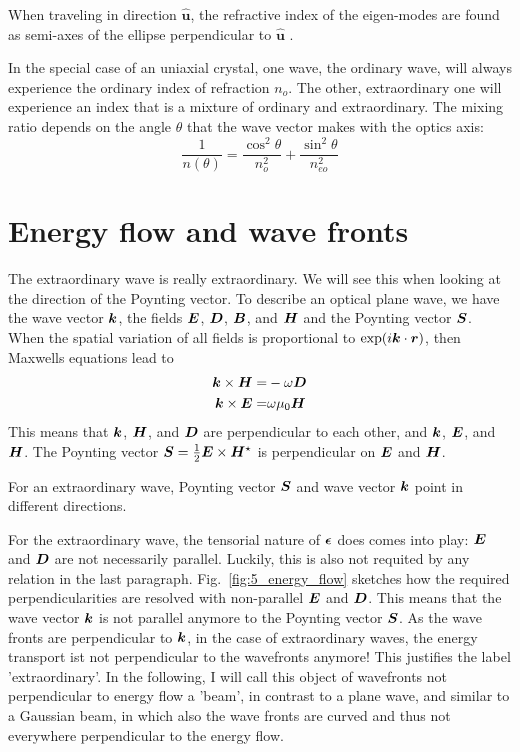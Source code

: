 \begin{marginfigure}
    \caption{When traveling in direction $\boldsymbol{\hat{u}}$, the refractive index of the eigen-modes are found as semi-axes of the ellipse perpendicular to $\boldsymbol{\hat{u}}$ .}
\end{marginfigure}


In the special case of an uniaxial crystal, one wave, the ordinary wave, will always experience the ordinary index of refraction $n_o$. The other, extraordinary  one will experience an index that is a mixture of ordinary and extraordinary. The mixing ratio depends on the angle $\theta$ that the wave vector makes with the optics axis:
\begin{equation}
    \frac{1}{n(\theta)} = \frac{\cos^2 \theta}{n_o^2} + \frac{\sin^2 \theta}{n_{eo}^2}
\end{equation}



\section{Energy flow and wave fronts}

The extraordinary wave is really extraordinary. We will see this when looking at the direction of the Poynting vector. To describe an optical plane wave, we have the wave vector $\boldsymbol{k}$, the fields $\boldsymbol{E}$, $\boldsymbol{D}$, $\boldsymbol{B}$, and $\boldsymbol{H}$ and the Poynting vector $\boldsymbol{S}$. When the spatial variation of all fields is proportional to $\exp(i \boldsymbol{k} \cdot \boldsymbol{r})$, then Maxwells equations lead to
\begin{align}
    \boldsymbol{k} \times \boldsymbol{H} = & - \omega \boldsymbol{D}  \label{eq:6_kHD}\\
    \boldsymbol{k} \times \boldsymbol{E} = &  \omega \mu_0 \boldsymbol{H}     \label{eq:6_kEH}
\end{align}
This means that $\boldsymbol{k}$, $\boldsymbol{H}$, and  $\boldsymbol{D}$ are perpendicular to each other, and  $\boldsymbol{k}$, $\boldsymbol{E}$, and $\boldsymbol{H}$. The Poynting vector $\boldsymbol{S} = \frac{1}{2} \boldsymbol{E} \times \boldsymbol{H}^\star$ is perpendicular on $\boldsymbol{E}$ and $\boldsymbol{H}$.

\begin{marginfigure}
    \caption{For an extraordinary wave, Poynting vector $\boldsymbol{S}$ and wave vector $\boldsymbol{k}$ point in different directions.
    \label{fig:5_energy_flow}}
\end{marginfigure}

For the extraordinary wave, the tensorial nature of $\boldsymbol{\epsilon}$ does  comes into play: $\boldsymbol{E}$ and $\boldsymbol{D}$ are not necessarily parallel. Luckily, this is also not  requited by any relation in the last paragraph. Fig.~\ref{fig:5_energy_flow} sketches how the required perpendicularities are resolved with non-parallel  $\boldsymbol{E}$ and $\boldsymbol{D}$. This means that the wave vector $\boldsymbol{k}$ is not parallel anymore to the Poynting vector $\boldsymbol{S}$. As the wave fronts are perpendicular to $\boldsymbol{k}$, in the case of extraordinary waves, the energy transport ist not perpendicular to the wavefronts anymore! This justifies the label 'extraordinary'. In the following, I will call this object of wavefronts not perpendicular to energy flow a 'beam', in contrast to a plane wave, and similar to a Gaussian beam, in which also the wave fronts are curved and thus not everywhere perpendicular to the energy flow.

